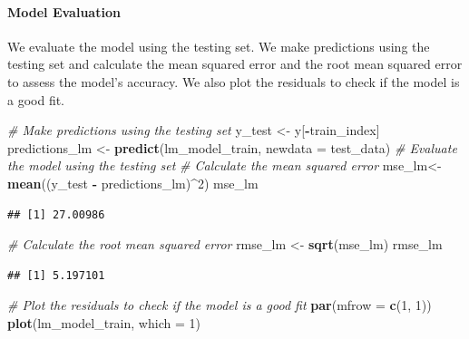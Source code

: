 \documentclass[
]{article}
\newenvironment{Shaded}{\begin{snugshade}}{\end{snugshade}}
\newcommand{\AttributeTok}[1]{\textcolor[rgb]{0.13,0.29,0.53}{#1}}
\newcommand{\CommentTok}[1]{\textcolor[rgb]{0.56,0.35,0.01}{\textit{#1}}}
\newcommand{\DecValTok}[1]{\textcolor[rgb]{0.00,0.00,0.81}{#1}}
\newcommand{\FunctionTok}[1]{\textcolor[rgb]{0.13,0.29,0.53}{\textbf{#1}}}
\newcommand{\NormalTok}[1]{#1}
\newcommand{\OtherTok}[1]{\textcolor[rgb]{0.56,0.35,0.01}{#1}}
\newcommand{\SpecialCharTok}[1]{\textcolor[rgb]{0.81,0.36,0.00}{\textbf{#1}}}
\begin{document}
\paragraph{Model Evaluation}\label{model-evaluation}

We evaluate the model using the testing set. We make predictions using
the testing set and calculate the mean squared error and the root mean
squared error to assess the model's accuracy. We also plot the residuals
to check if the model is a good fit.

\begin{Shaded}
\begin{Highlighting}[]
\CommentTok{\# Make predictions using the testing set}
\NormalTok{y\_test }\OtherTok{\textless{}{-}}\NormalTok{ y[}\SpecialCharTok{{-}}\NormalTok{train\_index]}
\NormalTok{predictions\_lm }\OtherTok{\textless{}{-}} \FunctionTok{predict}\NormalTok{(lm\_model\_train, }\AttributeTok{newdata =}\NormalTok{ test\_data)}
\CommentTok{\# Evaluate the model using the testing set}
\CommentTok{\# Calculate the mean squared error}
\NormalTok{mse\_lm}\OtherTok{\textless{}{-}} \FunctionTok{mean}\NormalTok{((y\_test }\SpecialCharTok{{-}}\NormalTok{ predictions\_lm)}\SpecialCharTok{\^{}}\DecValTok{2}\NormalTok{)}
\NormalTok{mse\_lm}
\end{Highlighting}
\end{Shaded}

\begin{verbatim}
## [1] 27.00986
\end{verbatim}

\begin{Shaded}
\begin{Highlighting}[]
\CommentTok{\# Calculate the root mean squared error}
\NormalTok{rmse\_lm }\OtherTok{\textless{}{-}} \FunctionTok{sqrt}\NormalTok{(mse\_lm)}
\NormalTok{rmse\_lm}
\end{Highlighting}
\end{Shaded}

\begin{verbatim}
## [1] 5.197101
\end{verbatim}

\begin{Shaded}
\begin{Highlighting}[]
\CommentTok{\# Plot the residuals to check if the model is a good fit}
\FunctionTok{par}\NormalTok{(}\AttributeTok{mfrow =} \FunctionTok{c}\NormalTok{(}\DecValTok{1}\NormalTok{, }\DecValTok{1}\NormalTok{))}
\FunctionTok{plot}\NormalTok{(lm\_model\_train, }\AttributeTok{which =} \DecValTok{1}\NormalTok{)}
\end{Highlighting}
\end{Shaded}
\end{document}
